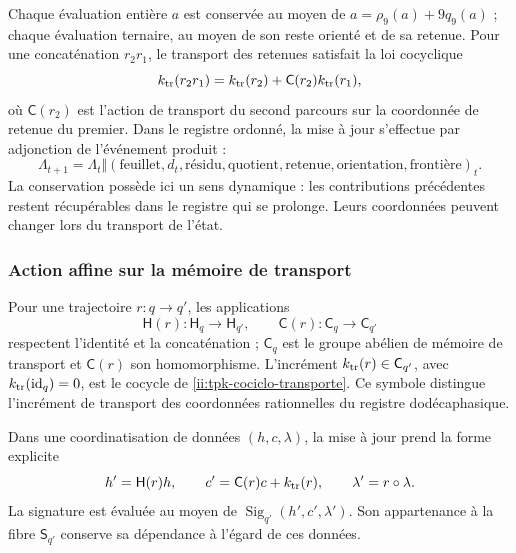 Chaque évaluation entière \(a\) est conservée au moyen de \(a=\rho_9(a)+9q_9(a)\) ; chaque évaluation ternaire, au moyen de son reste orienté et de sa retenue. Pour une concaténation \(r_2r_1\), le transport des retenues satisfait la loi cocyclique
\begin{equation}
 k_{\rm tr}(r_2r_1)
 =k_{\rm tr}(r_2)+\mathsf C(r_2)k_{\rm tr}(r_1),
 \label{ii:tpk-cociclo-transporte}
\end{equation}
où \(\mathsf C(r_2)\) est l'action de transport du second parcours sur la coordonnée de retenue du premier. Dans le registre ordonné, la mise à jour s'effectue par adjonction de l'événement produit :
\[
 \Lambda_{t+1}=\Lambda_t\Vert
 (\text{feuillet},d_t,\text{résidu},\text{quotient},
   \text{retenue},\text{orientation},\text{frontière})_t.
\]
La conservation possède ici un sens dynamique : les contributions précédentes restent récupérables dans le registre qui se prolonge. Leurs coordonnées peuvent changer lors du transport de l'état.

\subsubsection{Action affine sur la mémoire de transport}

Pour une trajectoire \(r:q\to q'\), les applications
\[
 \mathsf H(r):\mathsf H_q\to\mathsf H_{q'},\qquad
 \mathsf C(r):\mathsf C_q\to\mathsf C_{q'}
\]
respectent l'identité et la concaténation ; \(\mathsf C_q\) est le groupe abélien de mémoire de transport et \(\mathsf C(r)\) son homomorphisme. L'incrément \(k_{\rm tr}(r)\in\mathsf C_{q'}\), avec \(k_{\rm tr}(\operatorname{id}_q)=0\), est le cocycle de \eqref{ii:tpk-cociclo-transporte}. Ce symbole distingue l'incrément de transport des coordonnées rationnelles du registre dodécaphasique.

Dans une coordinatisation de données \((h,c,\lambda)\), la mise à jour prend la forme explicite
\begin{equation}
 h'=\mathsf H(r)h,\qquad
 c'=\mathsf C(r)c+k_{\rm tr}(r),\qquad
 \lambda'=r\circ\lambda.
 \label{ii:tpk-accion-afin}
\end{equation}
La signature est évaluée au moyen de \(\operatorname{Sig}_{q'}(h',c',\lambda')\). Son appartenance à la fibre \(\mathsf S_{q'}\) conserve sa dépendance à l'égard de ces données.


